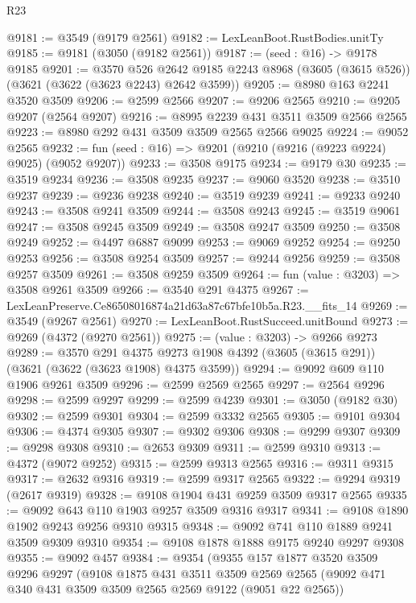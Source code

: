\begin{lexlean}{R23}
\begin{coremodule}
@9181 := @3549 (@9179 @2561)
@9182 := LexLeanBoot.RustBodies.unitTy
@9185 := @9181 (@3050 (@9182 @2561))
@9187 := (seed : @16) -> @9178 @9185
@9201 := @3570
    @526
    @2642
    @9185
    @2243
    @8968
    (@3605 (@3615 @526))
    (@3621 (@3622 (@3623 @2243) @2642 @3599))
@9205 := @8980 @163 @2241 @3520 @3509
@9206 := @2599 @2566
@9207 := @9206 @2565
@9210 := @9205 @9207 (@2564 @9207)
@9216 := @8995 @2239 @431 @3511 @3509 @2566 @2565
@9223 := @8980 @292 @431 @3509 @3509 @2565 @2566 @9025
@9224 := @9052 @2565
@9232 := fun (seed : @16) => @9201 (@9210 (@9216 (@9223 @9224) @9025) (@9052 @9207))
@9233 := @3508 @9175
@9234 := @9179 @30
@9235 := @3519 @9234
@9236 := @3508 @9235
@9237 := @9060 @3520
@9238 := @3510 @9237
@9239 := @9236 @9238
@9240 := @3519 @9239
@9241 := @9233 @9240
@9243 := @3508 @9241 @3509
@9244 := @3508 @9243
@9245 := @3519 @9061
@9247 := @3508 @9245 @3509
@9249 := @3508 @9247 @3509
@9250 := @3508 @9249
@9252 := @4497 @6887 @9099
@9253 := @9069 @9252
@9254 := @9250 @9253
@9256 := @3508 @9254 @3509
@9257 := @9244 @9256
@9259 := @3508 @9257 @3509
@9261 := @3508 @9259 @3509
@9264 := fun (value : @3203) => @3508 @9261 @3509
@9266 := @3540 @291 @4375
@9267 := LexLeanPreserve.Ce86508016874a21d63a87c67bfe10b5a.R23.__fits_14
@9269 := @3549 (@9267 @2561)
@9270 := LexLeanBoot.RustSucceed.unitBound
@9273 := @9269 (@4372 (@9270 @2561))
@9275 := (value : @3203) -> @9266 @9273
@9289 := @3570
    @291
    @4375
    @9273
    @1908
    @4392
    (@3605 (@3615 @291))
    (@3621 (@3622 (@3623 @1908) @4375 @3599))
@9294 := @9092 @609 @110 @1906 @9261 @3509
@9296 := @2599 @2569 @2565
@9297 := @2564 @9296
@9298 := @2599 @9297
@9299 := @2599 @4239
@9301 := @3050 (@9182 @30)
@9302 := @2599 @9301
@9304 := @2599 @3332 @2565
@9305 := @9101 @9304
@9306 := @4374 @9305
@9307 := @9302 @9306
@9308 := @9299 @9307
@9309 := @9298 @9308
@9310 := @2653 @9309
@9311 := @2599 @9310
@9313 := @4372 (@9072 @9252)
@9315 := @2599 @9313 @2565
@9316 := @9311 @9315
@9317 := @2632 @9316
@9319 := @2599 @9317 @2565
@9322 := @9294 @9319 (@2617 @9319)
@9328 := @9108 @1904 @431 @9259 @3509 @9317 @2565
@9335 := @9092 @643 @110 @1903 @9257 @3509 @9316 @9317
@9341 := @9108 @1890 @1902 @9243 @9256 @9310 @9315
@9348 := @9092 @741 @110 @1889 @9241 @3509 @9309 @9310
@9354 := @9108 @1878 @1888 @9175 @9240 @9297 @9308
@9355 := @9092 @457
@9384 := @9354
    (@9355
      @157
      @1877
      @3520
      @3509
      @9296
      @9297
      (@9108
        @1875
        @431
        @3511
        @3509
        @2569
        @2565
        (@9092 @471 @340 @431 @3509 @3509 @2565 @2569 @9122 (@9051 @22 @2565))

\end{coremodule}
\end{lexlean}
